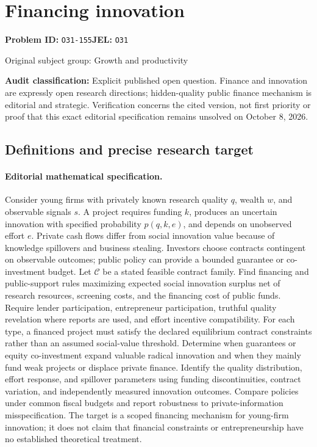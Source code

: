 \documentclass[11pt,a4paper]{article}
\begin{document}
\section*{Financing innovation}
\textbf{Problem ID:} \texttt{O31-155}\quad \textbf{JEL:} \texttt{O31}\par
\label{problem:OP-0267}
{\sffamily\small\color{muted}Original subject group: Growth and productivity\par}
\label{definitions:problem:30007548}
\textbf{Audit classification:} Explicit published open question. Finance and innovation are expressly open research directions; hidden-quality public finance mechanism is editorial and strategic. Verification concerns the cited version, not first priority or proof that this exact editorial specification remains unsolved on October 8, 2026.
\subsection*{Definitions and precise research target}
\paragraph{Editorial mathematical specification.} Consider young firms with privately known research quality \(q\), wealth \(w\), and observable signals \(s\). A project requires funding \(k\), produces an uncertain innovation with specified probability \(p(q,k,e)\), and depends on unobserved effort \(e\). Private cash flows differ from social innovation value because of knowledge spillovers and business stealing. Investors choose contracts contingent on observable outcomes; public policy can provide a bounded guarantee or co-investment budget. Let \(\mathcal C\) be a stated feasible contract family.
Find financing and public-support rules maximizing expected social innovation surplus net of research resources, screening costs, and the financing cost of public funds. Require lender participation, entrepreneur participation, truthful quality revelation where reports are used, and effort incentive compatibility. For each type, a financed project must satisfy the declared equilibrium contract constraints rather than an assumed social-value threshold.
Determine when guarantees or equity co-investment expand valuable radical innovation and when they mainly fund weak projects or displace private finance. Identify the quality distribution, effort response, and spillover parameters using funding discontinuities, contract variation, and independently measured innovation outcomes. Compare policies under common fiscal budgets and report robustness to private-information misspecification. The target is a scoped financing mechanism for young-firm innovation; it does not claim that financial constraints or entrepreneurship have no established theoretical treatment.
\end{document}
